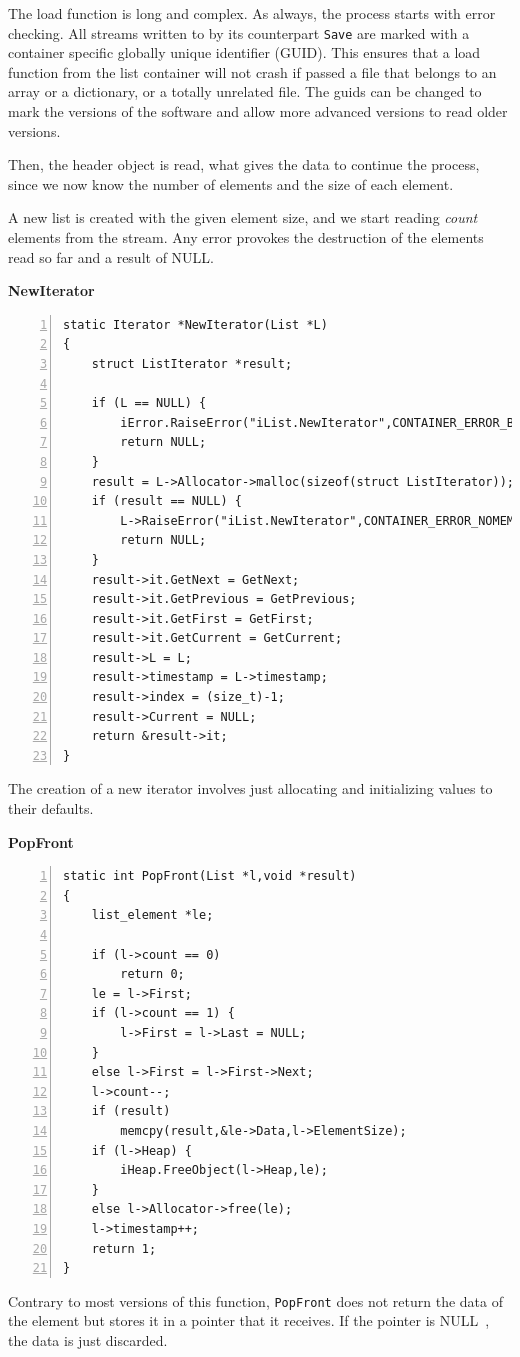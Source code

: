 \documentclass[12pt,a4paper]{memoir} %
\newif\iftth
\newcommand{\container}{}
\newcommand{\function}[1] {%
\vspace{0.2in}
\par\noindent
\textbf{#1}\index{#1!code for \container} \hrulefill
\iftth\else
\nopagebreak
\fi
\noindent\begin{Verbatim}[numbers=left, xleftmargin=7mm]}
\newcommand{\Null}{{\iftth \ NULL \else \footnotesize NULL\  \fi}}
\begin{document}
{{The load function is long and complex. As always, the process starts with error checking. All streams written to by its counterpart \texttt{Save} are 
marked with a container specific globally unique identifier (GUID). This ensures that a load function from the list container will not crash if passed a file that belongs to an array or a dictionary, or a totally unrelated file. The guids can be changed to mark the versions of the software and
allow more advanced versions to read older versions.

Then, the header object is read, what gives the data to continue the process, since we now know the number of elements and the size of each element.

A new list is created with the given element size, and we start reading \textsl{count} elements from the stream. Any error provokes the destruction of the elements read so far and a result of NULL.
\function{NewIterator}
static Iterator *NewIterator(List *L)
{
    struct ListIterator *result;
    
    if (L == NULL) {
        iError.RaiseError("iList.NewIterator",CONTAINER_ERROR_BADARG);
        return NULL;
    }
    result = L->Allocator->malloc(sizeof(struct ListIterator));
    if (result == NULL) {
        L->RaiseError("iList.NewIterator",CONTAINER_ERROR_NOMEMORY);
        return NULL;
    }
    result->it.GetNext = GetNext;
    result->it.GetPrevious = GetPrevious;
    result->it.GetFirst = GetFirst;
    result->it.GetCurrent = GetCurrent;
    result->L = L;
    result->timestamp = L->timestamp;
    result->index = (size_t)-1;
    result->Current = NULL;
    return &result->it;
}
\end{Verbatim}
The creation of a new iterator involves just allocating and initializing values to their defaults.
\function{PopFront}
static int PopFront(List *l,void *result)
{
    list_element *le;

    if (l->count == 0)
        return 0;
    le = l->First;
    if (l->count == 1) {
        l->First = l->Last = NULL;
    }
    else l->First = l->First->Next;
    l->count--;
    if (result)
        memcpy(result,&le->Data,l->ElementSize);
    if (l->Heap) {
        iHeap.FreeObject(l->Heap,le);
    }
    else l->Allocator->free(le);
    l->timestamp++;
    return 1;
}
\end{Verbatim}
Contrary to most versions of this function, \texttt{PopFront} does not return the data of the element but stores it in a pointer that it receives. If the pointer is \Null, the data is just discarded.

}}
\end{document}
